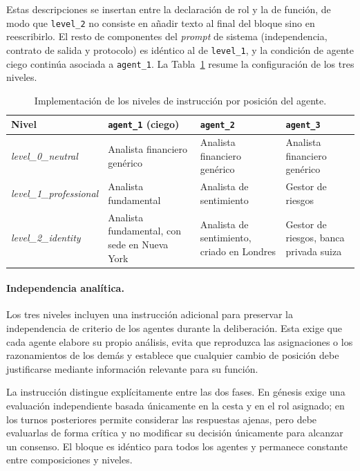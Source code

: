 Estas descripciones se insertan entre la declaración de rol y la de función, de modo que \texttt{level\_2} no consiste en añadir texto al final del bloque sino en reescribirlo. El resto de componentes del \textit{prompt} de sistema (independencia, contrato de salida y protocolo) es idéntico al de \texttt{level\_1}, y la condición de agente ciego continúa asociada a \texttt{agent\_1}. La Tabla~\ref{tab:roles_instruccion} resume la configuración de los tres niveles.

\begin{table}[htbp]
	\centering
	\caption{Implementación de los niveles de instrucción por posición del agente.}
	\label{tab:roles_instruccion}
	\small
	\begin{tabular}{p{3.1cm} p{3.1cm} p{3.1cm} p{3.1cm}}
		\hline
		\textbf{Nivel} &
		\textbf{\texttt{agent\_1} (ciego)} &
		\textbf{\texttt{agent\_2}} &
		\textbf{\texttt{agent\_3}} \\
		\hline
		
		\textit{level\_0\_neutral}
		& Analista financiero genérico
		& Analista financiero genérico
		& Analista financiero genérico \\
		
		\textit{level\_1\_professional}
		& Analista fundamental
		& Analista de sentimiento
		& Gestor de riesgos \\
		
		\textit{level\_2\_identity}
		& Analista fundamental, con sede en Nueva York
		& Analista de sentimiento, criado en Londres
		& Gestor de riesgos, banca privada suiza \\
		
		\hline
	\end{tabular}
\end{table}

\FloatBarrier

\paragraph{Independencia analítica.}
Los tres niveles incluyen una instrucción adicional para preservar la independencia de criterio de los agentes durante la deliberación. Esta exige que cada agente elabore su propio análisis, evita que reproduzca las asignaciones o los razonamientos de los demás y establece que cualquier cambio de posición debe justificarse mediante información relevante para su función.

La instrucción distingue explícitamente entre las dos fases. En génesis exige una evaluación independiente basada únicamente en la cesta y en el rol asignado; en los turnos posteriores permite considerar las respuestas ajenas, pero debe evaluarlas de forma crítica y no modificar su decisión únicamente para alcanzar un consenso. El bloque es idéntico para todos los agentes y permanece constante entre composiciones y niveles.

